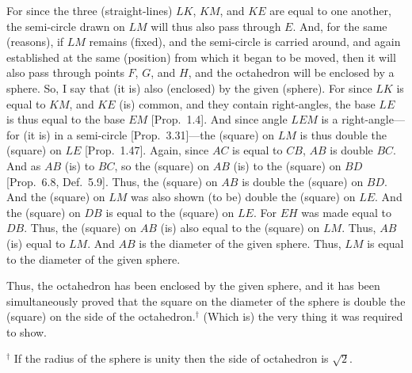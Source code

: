 \begin{Parallel}{}{}
{For since the three (straight-lines) $LK$, $KM$, and $KE$ are equal
to one another, the semi-circle drawn on $LM$ will thus also pass
through $E$. And, for the same (reasons), if $LM$ remains (fixed), and the semi-circle is carried around, and again established at the same
(position) from which it began to be moved, then it will also pass
through points $F$, $G$, and $H$, and the octahedron will be
enclosed by a sphere. So, I say that (it is) also (enclosed)
by the given (sphere). For since $LK$ is equal to $KM$, and $KE$
(is) common, and they contain right-angles, the base
$LE$ is thus equal to the base $EM$ [Prop.~1.4]. And since angle $LEM$
is a right-angle---for (it is) in a semi-circle [Prop.~3.31]---the
(square) on $LM$ is thus double the (square) on $LE$ [Prop.~1.47]. 
Again, since $AC$ is equal to $CB$, $AB$ is double $BC$. 
And as $AB$ (is) to $BC$, so the (square) on $AB$ (is) to the
(square) on $BD$ [Prop.~6.8, Def.~5.9]. Thus, the (square) on 
$AB$ is double the (square) on $BD$. And the (square) on $LM$
was also shown (to be) double the (square) on $LE$. And the (square)
on $DB$ is equal to the (square) on $LE$. For $EH$ was made equal
to $DB$. Thus, the (square) on $AB$ (is) also equal to the (square) on 
$LM$. Thus, $AB$ (is) equal to $LM$. And $AB$ is the diameter of the
given sphere. Thus, $LM$ is equal to the diameter of the given sphere.

Thus, the octahedron has been enclosed by the given sphere,  and it has
been simultaneously  proved that the square on the diameter of the sphere
is double the (square) on the side of the octahedron.$^\dag$ (Which is) the
very thing it was required to show.}
\end{Parallel}
{\footnotesize\noindent$^\dag$ If the radius of the sphere is unity then the
side of octahedron is $\sqrt{2}$.}

